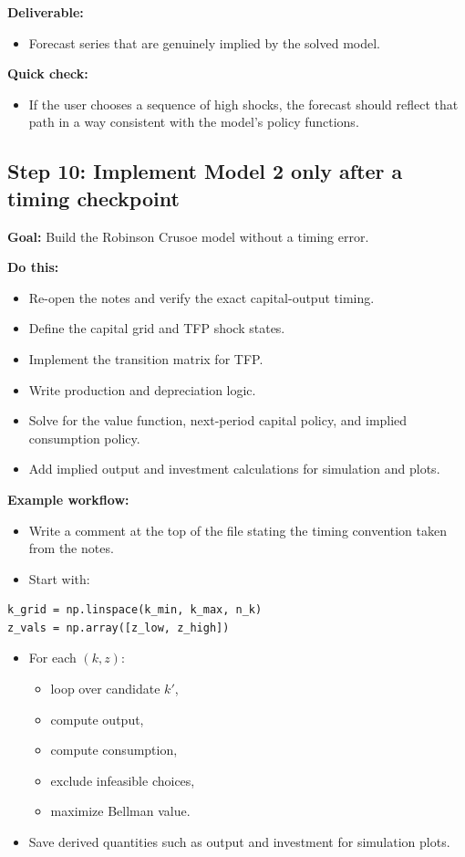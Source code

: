 \documentclass[11pt]{article}
\begin{document}
\textbf{Deliverable:}
\begin{itemize}
    \item Forecast series that are genuinely implied by the solved model.
\end{itemize}

\textbf{Quick check:}
\begin{itemize}
    \item If the user chooses a sequence of high shocks, the forecast should reflect that path in a way consistent with the model's policy functions.
\end{itemize}

\subsection{Step 10: Implement Model 2 only after a timing checkpoint}
\textbf{Goal:} Build the Robinson Crusoe model without a timing error.

\textbf{Do this:}
\begin{itemize}
    \item Re-open the notes and verify the exact capital-output timing.
    \item Define the capital grid and TFP shock states.
    \item Implement the transition matrix for TFP.
    \item Write production and depreciation logic.
    \item Solve for the value function, next-period capital policy, and implied consumption policy.
    \item Add implied output and investment calculations for simulation and plots.
\end{itemize}

\textbf{Example workflow:}
\begin{itemize}
    \item Write a comment at the top of the file stating the timing convention taken from the notes.
    \item Start with:
\end{itemize}
\begin{lstlisting}
k_grid = np.linspace(k_min, k_max, n_k)
z_vals = np.array([z_low, z_high])
\end{lstlisting}
\begin{itemize}
    \item For each \((k, z)\):
    \begin{itemize}
        \item loop over candidate \(k'\),
        \item compute output,
        \item compute consumption,
        \item exclude infeasible choices,
        \item maximize Bellman value.
    \end{itemize}
    \item Save derived quantities such as output and investment for simulation plots.
\end{itemize}
\end{document}
